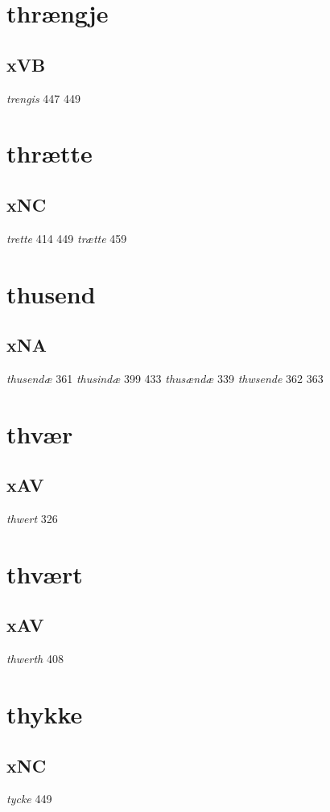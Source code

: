 \documentclass[a4paper,twocolumn]{article}
\begin{document}
\section{thrængje}
\label{sec:orgc48410c}
\subsection{xVB}
\label{sec:org1f214ad}
\emph{trengis} 447 449 
\section{thrætte}
\label{sec:org9464fe1}
\subsection{xNC}
\label{sec:org1d337ab}
\emph{trette} 414 449 \emph{trætte} 459 
\section{thusend}
\label{sec:org41d3293}
\subsection{xNA}
\label{sec:orgb14a218}
\emph{thusendæ} 361 \emph{thusindæ} 399 433 \emph{thusændæ} 339 \emph{thwsende} 362 363 
\section{thvær}
\label{sec:orged11983}
\subsection{xAV}
\label{sec:orgbd9566e}
\emph{thwert} 326 
\section{thvært}
\label{sec:org95643bb}
\subsection{xAV}
\label{sec:orgaa191ec}
\emph{thwerth} 408 
\section{thykke}
\label{sec:org0d3cbcf}
\subsection{xNC}
\label{sec:orgf042560}
\emph{tycke} 449 
\end{document}
